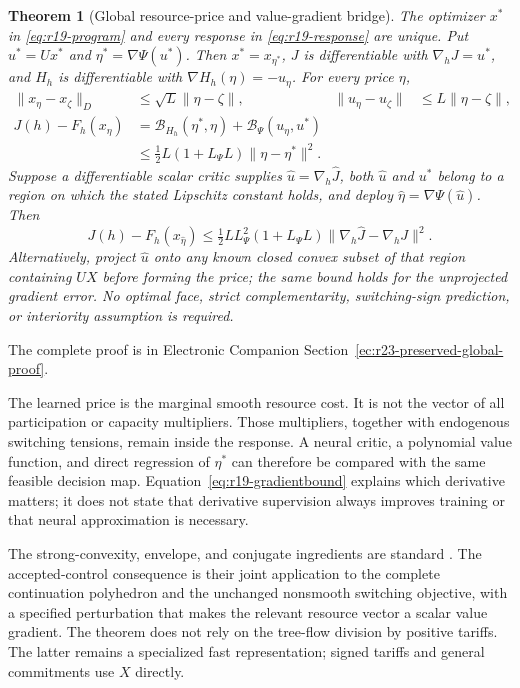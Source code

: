 \documentclass[11pt,letterpaper]{article}
\newtheorem{theorem}{Theorem}[section]
\theoremstyle{definition}
\newcommand{\1}{\mathbf 1}
\begin{document}
\begin{theorem}[Global resource-price and value-gradient bridge]\label{thm:r19-global}
The optimizer $x^*$ in \eqref{eq:r19-program} and every response in \eqref{eq:r19-response} are unique. Put $u^*=Ux^*$ and $\eta^*=\nabla\Psi(u^*)$. Then $x^*=x_{\eta^*}$, $J$ is differentiable with $\nabla_hJ=u^*$, and $H_h$ is differentiable with $\nabla H_h(\eta)=-u_\eta$. For every price $\eta$,
\begin{align}
 \|x_\eta-x_\zeta\|_D&\leq\sqrt L\|\eta-\zeta\|,
 &\|u_\eta-u_\zeta\|&\leq L\|\eta-\zeta\|,\label{eq:r19-lipschitz}\\
 J(h)-F_h(x_\eta)
 &=\mathcal B_{H_h}(\eta^*,\eta)+\mathcal B_\Psi(u_\eta,u^*)\label{eq:r19-identity}\\
 &\leq\tfrac12L(1+L_\Psi L)\|\eta-\eta^*\|^2.\label{eq:r19-pricebound}
\end{align}
Suppose a differentiable scalar critic supplies $\widehat u=\nabla_h\widehat J$, both $\widehat u$ and $u^*$ belong to a region on which the stated Lipschitz constant holds, and deploy $\widehat\eta=\nabla\Psi(\widehat u)$. Then
\begin{equation}\label{eq:r19-gradientbound}
 J(h)-F_h(x_{\widehat\eta})
 \leq\tfrac12L L_\Psi^2(1+L_\Psi L)
              \|\nabla_h\widehat J-\nabla_hJ\|^2.
\end{equation}
Alternatively, project $\widehat u$ onto any known closed convex subset of that region containing $UX$ before forming the price; the same bound holds for the unprojected gradient error. No optimal face, strict complementarity, switching-sign prediction, or interiority assumption is required.
\end{theorem}
The complete proof is in Electronic Companion Section~\ref{ec:r23-preserved-global-proof}.

The learned price is the marginal smooth resource cost. It is not the vector of all participation or capacity multipliers. Those multipliers, together with endogenous switching tensions, remain inside the response. A neural critic, a polynomial value function, and direct regression of $\eta^*$ can therefore be compared with the same feasible decision map. Equation~\eqref{eq:r19-gradientbound} explains which derivative matters; it does not state that derivative supervision always improves training or that neural approximation is necessary.

The strong-convexity, envelope, and conjugate ingredients are standard \citep{BoydVandenberghe2004}. The accepted-control consequence is their joint application to the complete continuation polyhedron and the unchanged nonsmooth switching objective, with a specified perturbation that makes the relevant resource vector a scalar value gradient. The theorem does not rely on the tree-flow division by positive tariffs. The latter remains a specialized fast representation; signed tariffs and general commitments use $X$ directly.
\end{document}
